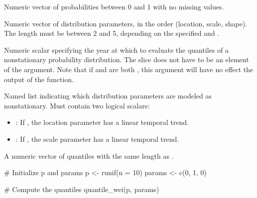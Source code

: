 \documentclass[a4paper]{book}
\begin{document}
%
\begin{Arguments}
\begin{ldescription}
\item[\code{p}] Numeric vector of probabilities between 0 and 1 with no missing values.

\item[\code{params}] Numeric vector of distribution parameters, in the order (location,
scale, shape). The length must be between 2 and 5, depending on the specified
 and .

\item[\code{slice}] Numeric scalar specifying the year at which to evaluate the
quantiles of a nonstationary probability distribution. The slice does not
have to be an element of the  argument. Note that if 
and  are both , this argument will have no effect the
output of the function.

\item[\code{structure}] Named list indicating which distribution parameters are
modeled as nonstationary. Must contain two logical scalars:
\begin{itemize}

\item{} : If , the location parameter has a linear temporal trend.
\item{} : If , the scale parameter has a linear temporal trend.

\end{itemize}

\end{ldescription}
\end{Arguments}
%
\begin{Value}
A numeric vector of quantiles with the same length as .
\end{Value}
%
\begin{SeeAlso}
\end{SeeAlso}
%
\begin{Examples}
\begin{ExampleCode}
# Initialize p and params
p <- runif(n = 10)
params <- c(0, 1, 0)

# Compute the quantiles
quantile_wei(p, params)

\end{ExampleCode}
\end{Examples}
\end{document}
